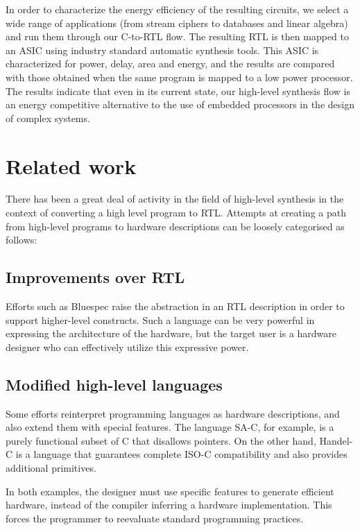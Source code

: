 \documentclass[conference]{IEEEtran}
\begin{document}
In order to characterize the energy efficiency of the resulting
circuits, we select a wide range of applications (from stream ciphers
to databases and linear algebra) and run them through our C-to-RTL
flow. The resulting RTL is then mapped to an ASIC using industry
standard automatic synthesis tools. This ASIC is characterized for
power, delay, area and energy, and the results are compared with those
obtained when the same program is mapped to a low power processor.
The results indicate that even in its current state, our high-level
synthesis flow is an energy competitive alternative to the use of
embedded processors in the design of complex systems.


\section{Related work}

There has been a great deal of activity in the field of 
high-level synthesis in the context of converting a high
level program to RTL.   Attempts at creating a path from 
high-level programs to hardware descriptions can be loosely 
categorised as follows:

\subsection{Improvements over RTL}

Efforts such as Bluespec\cite{bluespec-memo} raise the abstraction in an
RTL description in order to support higher-level constructs. Such a
language can be very powerful in expressing the architecture of the
hardware, but the target user is a hardware designer who can
effectively utilize this expressive power.

\subsection{Modified high-level languages}

Some efforts reinterpret programming languages as hardware
descriptions, and also extend them with special features. The language
SA-C\cite{SA-C}, for example, is a purely
functional subset of C that disallows pointers. On the other hand,
Handel-C\cite{handel-c} is a language that guarantees complete ISO-C
compatibility and also provides additional primitives.

In both examples, the designer must use specific features to generate
efficient hardware, instead of the compiler inferring a hardware
implementation. This forces the programmer to reevaluate standard
programming practices.
\end{document}
